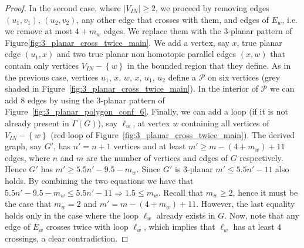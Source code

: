 \begin{proof}
In the second case, where $|V_{IN}|\geq 2$, we proceed by removing edges $(u_1,v_1)$, $(u_2,v_2)$, any other edge that crosses with them, and edges of $E_w$, i.e. we remove at most $4+m_w$ edges. We replace them with the $3$-planar pattern of Figure\ref{fig:3_planar_cross_twice_main}. We add a vertex, say $x$, true planar edge $(u_1,x)$ and two true planar non homotopic parallel edges $(x,w)$ that contain only vertices $V_{IN}-\left\{w\right\}$ in the bounded region that they define. As in the previous case, vertices $u_1$, $x$, $w$, $x$, $u_1$, $u_2$ define a \pp $\mathcal{P}$ on six vertices (grey shaded in Figure~\ref{fig:3_planar_cross_twice_main}). In the interior of $\mathcal{P}$ we can add $8$ edges by using the $3$-planar pattern of Figure~\ref{fig:3_planar_polygon_conf_6}. Finally, we can add a loop (if it is not already present in $\Gamma(G)$), say $\ell_w$,  at vertex $w$ containing all vertices of $V_{IN}-\left\{w\right\}$ (red loop of Figure~\ref{fig:3_planar_cross_twice_main}). The derived graph, say $G'$, has $n'=n+1$ vertices and at least $m'\geq m-(4+m_w)+11$ edges, where $n$ and $m$ are the number of vertices and edges of $G$ respectively. Hence $G'$ has $m'\geq 5.5n'-9.5-m_w$. Since $G'$ is $3$-planar $m'\leq 5.5n'-11$ also holds. By combining the two equations we have that $5.5n'-9.5-m_w\leq 5.5n'-11\Rightarrow 1.5\leq m_w$. Recall that $m_w\geq 2$, hence it must be the case that $m_w=2$ and $m'= m-(4+m_w)+11$. However, the last equality holds only in the case where the loop $\ell_w$ already exists in $G$. Now, note that any edge of $E_w$ crosses twice with loop $\ell_w$, which implies that $\ell_w$ has at least $4$ crossings, a clear contradiction.
\end{proof}

